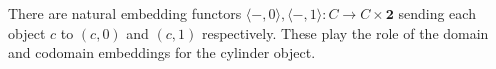 There are natural embedding functors $\langle -, 0 \rangle, \langle -, 1 \rangle: C \to C \times \mathbf{2}$ sending each object $c$ to $(c, 0)$ and $(c, 1)$ respectively. These play the role of the domain and codomain embeddings for the cylinder object.
